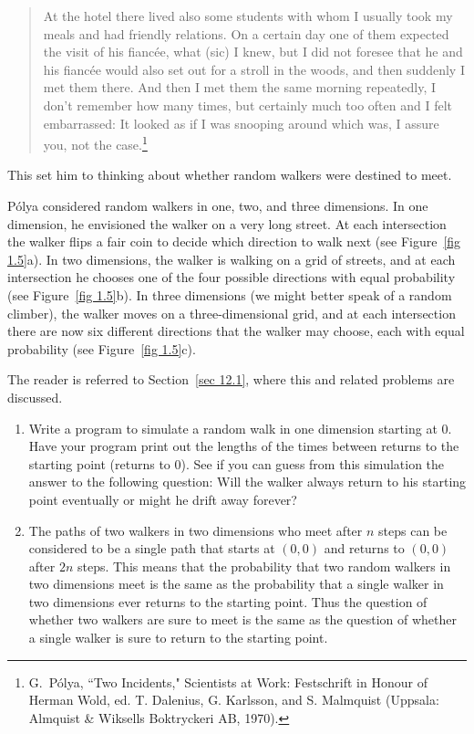 \begin{LJSItem}
\begin{quote}
At the hotel there lived also some students with whom I usually took my meals and had friendly
relations.  On a certain day one of them expected the visit of his fianc\'ee, what (sic) I knew, but 
I did not foresee that he and his fianc\'ee would also set out for a stroll in the woods, and then
suddenly I met them there.  And then I met them the same morning repeatedly, I don't remember how many
times, but certainly much too often and I felt embarrassed:  It looked as if I was snooping around
which was, I assure you, not the case.\footnote{G.~P\'olya, ``Two Incidents," \emx
{Scientists at Work: Festschrift in Honour of Herman Wold,} ed. T. Dalenius, G. Karlsson, and S.
Malmquist (Uppsala: Almquist \& Wiksells Boktryckeri AB, 1970).}
\end{quote}
This set him to thinking about whether random walkers were destined to meet.
\par
P\'olya considered random walkers in one, two, and three dimensions.  In one dimension, he envisioned the walker on a very long street.  At each
intersection the walker flips a fair coin to decide which direction to walk
next (see Figure~\ref {fig 1.5}a).  In two dimensions, the walker is walking
on a grid of streets, and at each intersection he chooses one of the four
possible directions with equal probability (see Figure~\ref {fig 1.5}b).  In
three dimensions (we might better speak of a random climber), the walker
moves on a three-dimensional grid, and at each intersection there are now six
different directions that the walker may choose, each with equal probability
(see Figure~\ref {fig 1.5}c).
\par
The reader is referred to Section~\ref{sec 12.1}, where this and related problems are 
discussed.

\begin{enumerate}

\item Write a program to simulate a random walk in one dimension starting at
0.  Have your program print out the lengths of the times between returns to
the
starting point (returns to 0).  See if you can guess from this simulation the
answer to the following question: Will the walker always return to his
starting
point eventually or might he drift away forever?

\item The paths of two walkers in two dimensions who meet after $n$ steps
can be considered to be a single path that starts at $(0,0)$ and returns to
$(0,0)$ after $2n$ steps.  This means that the probability that two random
walkers in two dimensions meet is the same as the probability that a single
walker in two dimensions ever returns to the starting point.  Thus the
question of whether two walkers are sure to meet is the same as the question
of
whether a single walker is sure to return to the starting point.


\end{enumerate}
\end{LJSItem}
